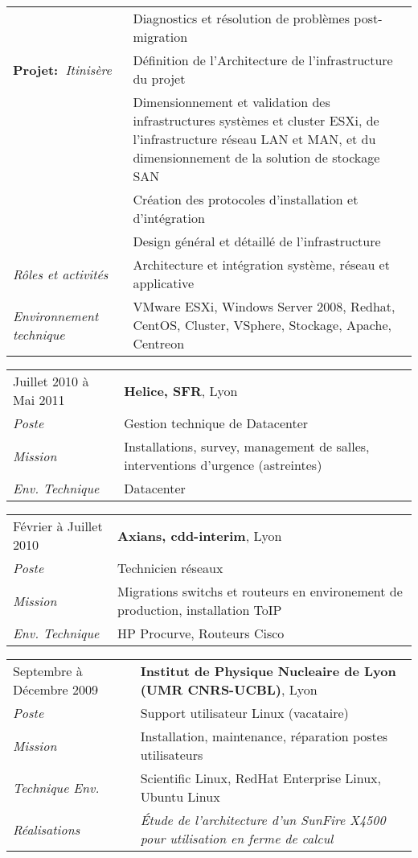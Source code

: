 \documentclass[a4paper,8pt]{article}
\begin{document}
\begin{tabular}{P{3.5cm}|p{13cm}}
									& Diagnostics et résolution de problèmes post-migration\\
\textbf{Projet:~}\textit{Itinisère}	& Définition de l’Architecture de l'infrastructure du projet\\
									& Dimensionnement et validation des infrastructures systèmes et cluster ESXi, de l'infrastructure réseau LAN et MAN, et du dimensionnement de la solution de stockage SAN\\
									& Création des protocoles d'installation et d'intégration\\
									& Design général et détaillé de l'infrastructure\\
\textsl{Rôles et activités}			& Architecture et intégration système, réseau et applicative\\
\textsl{Environnement technique}	& VMware ESXi, Windows Server 2008, Redhat, CentOS, Cluster, VSphere, Stockage, Apache, Centreon\\
\end{tabular}
\begin{tabular}{P{3.5cm}|p{13cm}}
Juillet 2010 à Mai 2011	& \textbf{Helice, SFR}, Lyon\\
\textsl{Poste}			& Gestion technique de Datacenter\\
\textsl{Mission}		& Installations, survey, management de salles, interventions d'urgence (astreintes)\\
\textsl{Env. Technique}	& Datacenter\\
\end{tabular}
\begin{tabular}{P{3.5cm}|p{13cm}}
Février à Juillet 2010	& \textbf{Axians, cdd-interim}, Lyon\\
\textsl{Poste}	 		& Technicien réseaux\\
\textsl{Mission}		& Migrations switchs et routeurs en environement de production, installation ToIP\\
\textsl{Env. Technique}	& HP Procurve, Routeurs Cisco\\
\end{tabular}
\begin{tabular}{P{3.5cm}|p{13cm}}
Septembre à Décembre 2009		& \textbf{Institut de Physique Nucleaire de Lyon (UMR CNRS-UCBL)}, Lyon\\
\textsl{Poste}	 		& Support utilisateur Linux (vacataire)\\
\textsl{Mission} 		& Installation, maintenance, réparation postes utilisateurs\\
\textsl{Technique Env.}	& Scientific Linux, RedHat Enterprise Linux, Ubuntu Linux\\
\textsl{Réalisations}	& \textsl{\'{E}tude de l'architecture d'un SunFire X4500 pour utilisation en ferme de calcul}\\
\end{tabular}
\end{document}
